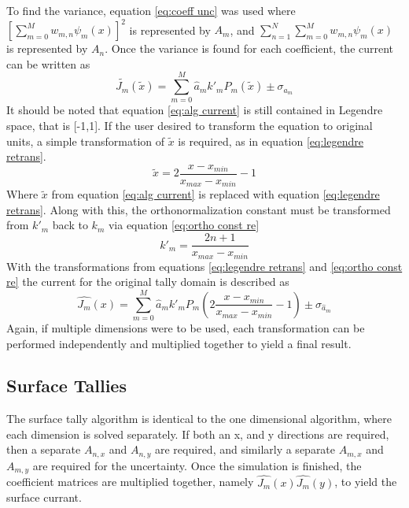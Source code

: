 \documentclass[10tma4paper]{article}
\begin{document}
To find the variance, equation \eqref{eq:coeff unc} was used where $[\sum_{m=0}^{M}w_{m,n}\psi_{m}(x)]^{2}$ is represented by $A_{m}$, and $\sum_{n=1}^{N}\sum_{m=0}^{M}w_{m,n}\psi_{m}(x)$ is represented by $A_{n}$. Once the variance is found for each coefficient, the current can be written as
\begin{equation}\label{eq:alg current}
	\tilde{J_{m}}(\tilde{x}) = \sum_{m=0}^{M}\hat{a}_{m}k'_{m}P_{m}(\tilde{x}) \pm  \sigma_{\hat{a}_{m}}
\end{equation}
It should be noted that equation \eqref{eq:alg current} is still contained in Legendre space, that is [-1,1]. If the user desired to transform the equation to original units, a simple transformation of $\tilde{x}$ is required, as in equation \eqref{eq:legendre retrans}.
\begin{equation}\label{eq:legendre retrans}
\tilde{x} = 2\frac{x-x_{min}}{x_{max}-x_{min}}-1
\end{equation}
Where $\tilde{x}$ from equation \eqref{eq:alg current} is replaced with equation \eqref{eq:legendre retrans}. Along with this, the orthonormalization constant must be transformed from $k'_{m}$ back to $k_{m}$ via equation \eqref{eq:ortho const re}
\begin{equation}\label{eq:ortho const re}
k'_{m} = \frac{2n+1}{x_{max}-x_{min}}
\end{equation}
With the transformations from equations \eqref{eq:legendre retrans} and \eqref{eq:ortho const re} the current for the original tally domain is described as 
\begin{equation}\label{eq:final current}
	\hat{J_{m}}(x) = \sum_{m=0}^{M}\hat{a}_{m}k'_{m}P_{m}(2\frac{x-x_{min}}{x_{max}-x_{min}}-1) \pm  \sigma_{\hat{a}_{m}}
\end{equation}
Again, if multiple dimensions were to be used, each transformation can be performed independently and multiplied together to yield a final result. 

\subsection{Surface Tallies}\label{Surface}
The surface tally algorithm is identical to the one dimensional algorithm, where each dimension is solved separately. If both an x, and y directions are required, then a separate $A_{n,x}$ and $A_{n,y}$ are required, and similarly a separate $A_{m,x}$ and $A_{m,y}$ are required for the uncertainty. Once the simulation is finished, the coefficient matrices are multiplied together, namely  $\hat{J_{m}}(x)\hat{J_{m}}(y)$, to yield the surface currant.
\end{document}
